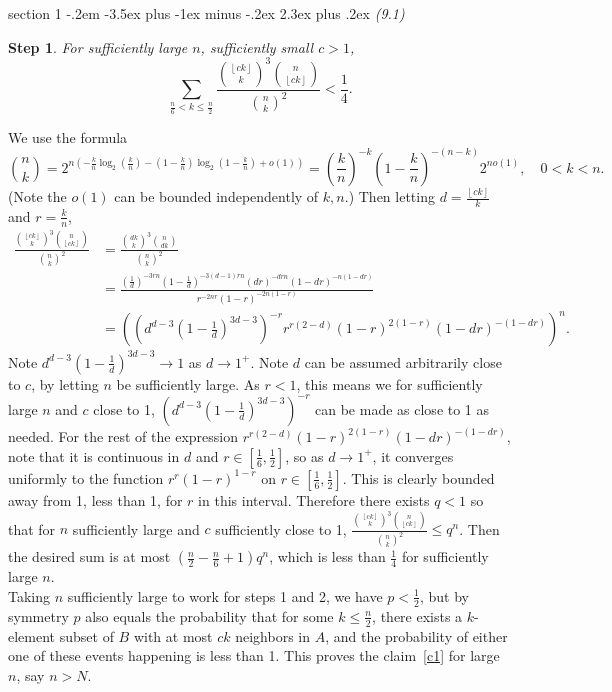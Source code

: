 \documentclass[12pt]{article}
\makeatletter
\theoremstyle{norm}
\newtheorem{st}{Step}
\newcommand{\rc}[1]{\frac{1}{#1}}
\newcommand{\pa}[1]{\left( {#1} \right)}
\newcommand{\fl}[1]{\left\lfloor {#1}\right\rfloor}
\newcommand{\pf}[2]{\pa{\frac{#1}{#2}}}
\newcommand{\prc}[1]{\pa{\rc{#1}}}
\newenvironment{problem}{\@startsection
       {section}
       {1}
       {-.2em}
       {-3.5ex plus -1ex minus -.2ex}
       {2.3ex plus .2ex}
       {\pagebreak[3]%
       \large\bf\noindent{Problem }
       }
       }
       {%
       }
\makeatother
\begin{document}
\begin{problem}{\it(9.1)}
\begin{st}
For sufficiently large $n$, sufficiently small $c>1$,
\[
\sum_{\frac n6< k\le \frac n2} \frac{\binom{\fl{ck}}{k}^3\binom{n}{\fl{ck}}}{\binom nk^2}< \rc 4.
\]
\end{st}
We use the formula
\[
\binom{n}{k}=2^{n\pa{-\frac kn \log_2 \pf kn-\pa{1-\frac kn}\log_2\pa{1-\frac kn}+o(1)}}=\pf kn^{-k}\pa{1-\frac kn}^{-(n-k)}2^{no(1)},\quad 0<k<n.
\]
(Note the $o(1)$ can be bounded independently of $k,n$.) Then letting $d=\frac{\fl{ck}}{k}$ and $r=\frac{k}{n}$,
\begin{align*}
\frac{\binom{\fl{ck}}{k}^3\binom{n}{\fl{ck}}}{\binom nk^2}
&=\frac{\binom{dk}{k}^3\binom{n}{dk}}{\binom nk^2}\\
&=\frac{\prc d^{-3rn}\pa{1-\rc d}^{-3(d-1)rn} (dr)^{-drn} (1-dr)^{-n(1-dr)}}{r^{-2nr}(1-r)^{-2n(1-r)}}\\
&=\pa{\pa{d^{d-3}\pa{1-\rc d}^{3d-3}}^{-r}r^{r(2-d)}(1-r)^{2(1-r)}(1-dr)^{-(1-dr)}}^{n}.
\end{align*}
Note $d^{d-3}\pa{1-\rc d}^{3d-3}\to 1$ as $d\to 1^+$. Note $d$ can be assumed arbitrarily close to $c$, by letting $n$ be sufficiently large. As $r<1$, this means we for sufficiently large $n$ and $c$ close to 1,
$\pa{d^{d-3}\pa{1-\rc d}^{3d-3}}^{-r}$ can be made as close to 1 as needed. For the rest of the expression $r^{r(2-d)}(1-r)^{2(1-r)}(1-dr)^{-(1-dr)}$, note that it is continuous in $d$ and $r\in [\rc 6,\rc 2]$, so as $d\to 1^+$, it converges uniformly to the function $r^{r}(1-r)^{1-r}$ on $r\in [\rc 6,\rc 2]$. This is clearly bounded away from 1, less than 1, for $r$ in this interval. Therefore there exists $q<1$ so that for $n$ sufficiently large and $c$ sufficiently close to 1, $\frac{\binom{\fl{ck}}{k}^3\binom{n}{\fl{ck}}}{\binom nk^2}\le q^n$. Then the desired sum is at most $\pa{\frac{n}{2}-\frac{n}{6}+1}q^n$, which is less than $\rc 4$ for sufficiently large $n$.\\

Taking $n$ sufficiently large to work for steps 1 and 2, we have $p<\rc2$, but by symmetry $p$ also equals the probability that for some $k\le \frac n2$, there exists a $k$-element subset of $B$ with at most $ck$ neighbors in $A$, and the probability of either one of these events happening is less than 1. This proves the claim~\ref{c1} for large $n$, say $n> N$.\\ %


\end{problem}
\end{document}
